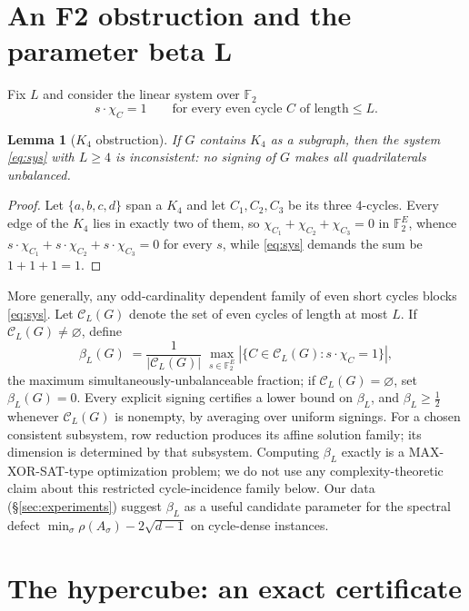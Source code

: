 \documentclass[11pt]{article}
\newtheorem{lemma}{Lemma}
\theoremstyle{remark}
\newcommand{\F}{\mathbb{F}}
\newcommand{\rhomax}{\rho}
\begin{document}
\section{An F2 obstruction and the parameter beta L}

Fix $L$ and consider the linear system over $\F_2$
\begin{equation}\label{eq:sys}
s\cdot\chi_C=1\qquad\text{for every even cycle $C$ of length}\le L .
\end{equation}

\begin{lemma}[$K_4$ obstruction]\label{lem:k4}
If $G$ contains $K_4$ as a subgraph, then the system \eqref{eq:sys} with
$L\ge4$ is inconsistent: no signing of $G$ makes all quadrilaterals
unbalanced.
\end{lemma}

\begin{proof}
Let $\{a,b,c,d\}$ span a $K_4$ and let $C_1,C_2,C_3$ be its three
$4$-cycles. Every edge of the $K_4$ lies in exactly two of them, so
$\chi_{C_1}+\chi_{C_2}+\chi_{C_3}=0$ in $\F_2^E$, whence
$s\cdot\chi_{C_1}+s\cdot\chi_{C_2}+s\cdot\chi_{C_3}=0$ for every $s$,
while \eqref{eq:sys} demands the sum be $1+1+1=1$.
\end{proof}

More generally, any odd-cardinality dependent family of even short
cycles blocks \eqref{eq:sys}. Let $\mathcal C_L(G)$ denote the set of even
cycles of length at most $L$. If $\mathcal C_L(G)\ne\varnothing$, define
\[
\beta_L(G)\;=\frac{1}{|\mathcal C_L(G)|}\;\max_{s\in\F_2^E}
|\{C\in\mathcal C_L(G):s\cdot\chi_C=1\}|,
\]
the maximum simultaneously-unbalanceable fraction; if
$\mathcal C_L(G)=\varnothing$, set $\beta_L(G)=0$. Every explicit
signing certifies a lower bound on $\beta_L$, and $\beta_L\ge\tfrac12$
whenever $\mathcal C_L(G)$ is nonempty, by averaging over uniform
signings. For a chosen consistent subsystem, row reduction produces its affine
solution family; its dimension is determined by that subsystem.
Computing $\beta_L$ exactly is a MAX-XOR-SAT-type optimization problem;
we do not use any complexity-theoretic claim about this restricted
cycle-incidence family below. Our data
(\S\ref{sec:experiments}) suggest $\beta_L$ as a useful candidate parameter for the spectral
defect $\min_\sigma\rhomax(A_\sigma)-2\sqrt{d-1}$ on cycle-dense instances.

\section{The hypercube: an exact certificate}
\end{document}
